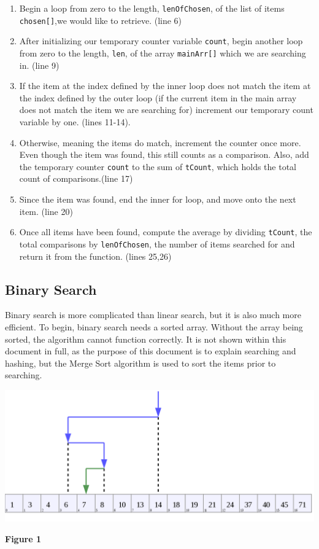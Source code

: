 \documentclass[letterpaper, 10pt]{article}
\begin{document}
\begin{enumerate}
    \item Begin a loop from zero to the length, \texttt{lenOfChosen}, of the list of items \texttt{chosen[]},we would like to retrieve. (line 6)
    \item After initializing our temporary counter variable \texttt{count}, begin another loop from zero to the length, \texttt{len}, of the array \texttt{mainArr[]} which we are searching in. (line 9)
    \item If the item at the index defined by the inner loop does not match the item at the index defined by the outer loop (if the current item in the main array does not match the item we are searching for) increment our temporary count variable by one. (lines 11-14).
    \item Otherwise, meaning the items do match, increment the counter once more. Even though the item was found, this still counts as a comparison. Also, add the temporary counter \texttt{count} to the sum of \texttt{tCount}, which holds the total count of comparisons.(line 17)
    \item Since the item was found, end the inner for loop, and move onto the next item. (line 20)
    \item Once all items have been found, compute the average by dividing \texttt{tCount}, the total comparisons by \texttt{lenOfChosen}, the number of items searched for and return it from the function. (lines 25,26)
\end{enumerate}
\subsection{Binary Search}

Binary search is more complicated than linear search, but it is also much more efficient. To begin, binary search needs a sorted array. Without the array being sorted, the algorithm cannot function correctly. It is not shown within this document in full, as the purpose of this document is to explain searching and hashing, but the Merge Sort algorithm is used to sort the items prior to searching. 

\begin{center}
\includegraphics[width=\textwidth]{binSearch.png}
\end{center}
\textbf{Figure 1}
\end{document}
